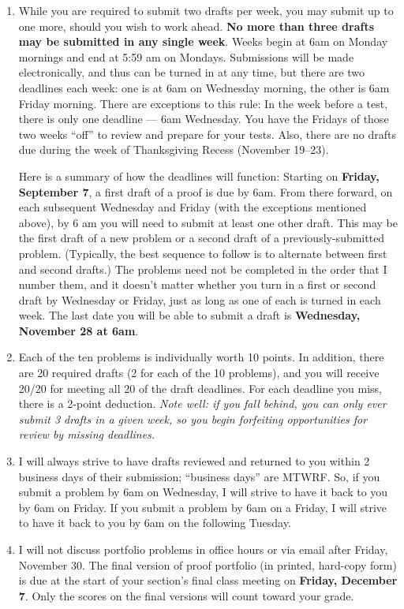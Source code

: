 \documentclass[11pt]{article}
\begin{document}
\begin{enumerate}[itemsep=0pt]
	\item While you are required to submit two drafts per week, you may submit up to one more, should you wish to work ahead.  \textbf{No more than three drafts may be submitted in any single week}. Weeks begin at 6am on Monday mornings and end at 5:59 am on Mondays. Submissions will be made electronically, and thus can be turned in at any time, but there are two deadlines each week: one is at 6am on Wednesday morning, the other is 6am Friday morning. There are exceptions to this rule: In the week before a test, there is only one deadline --- 6am Wednesday. You have the Fridays of those two weeks ``off'' to review and prepare for your tests. Also, there are  no drafts due during the week of Thanksgiving Recess (November 19--23). 

	Here is a summary of how the deadlines will function:  Starting on \textbf{Friday, September 7}, a first draft of a proof is due by 6am.  From there forward, on each subsequent Wednesday and Friday (with the exceptions mentioned above), by 6 am you will need to submit at least one other draft. This may be the first draft of a new problem or a second draft of a previously-submitted problem. (Typically, the best sequence to follow is to alternate between first and second drafts.) The problems need not be completed in the order that I number them, and it doesn't matter whether you turn in a first or second draft by Wednesday or Friday, just as long as one of each is turned in each week.  The last date you will be able to submit a draft is \textbf{Wednesday, November 28 at 6am}. 
	
	\item Each of the ten problems is individually worth 10 points.  In addition, there are 20 required drafts (2 for each of the 10 problems), and you will receive 20/20 for meeting all 20 of the draft deadlines.  For each deadline you miss, there is a 2-point deduction.  \emph{Note well: if you fall behind, you can only ever submit 3 drafts in a given week, so you begin forfeiting opportunities for review by missing deadlines.}

	\item I will always strive to have drafts reviewed and returned to you within 2 business days of their submission; ``business days'' are MTWRF.  So, if you submit a problem by 6am on Wednesday, I will strive to have it back to you by 6am on Friday. If you submit a problem by 6am on a Friday, I will strive to have it back to you by 6am on the following Tuesday. 

	\item I will not discuss portfolio problems in office hours or via email after Friday, November 30.  The final version of proof portfolio (in printed, hard-copy form) is due at the start of your section's final class meeting on \textbf{Friday, December 7}. Only the scores on the final versions will count toward your grade.
	
\end{enumerate}
\end{document}
